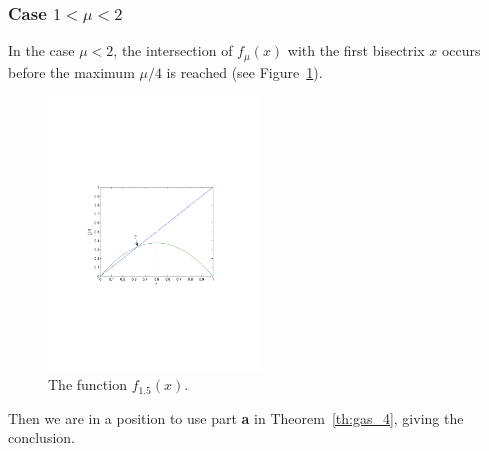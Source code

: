 \documentclass[12pt]{article}
\theoremstyle{plain}
\begin{document}
\subsubsection{Case $1<\mu<2$}
In the case $\mu<2$, the intersection of $f_\mu(x)$ with the first bisectrix $x$ occurs before the maximum $\mu/4$ is reached (see Figure~\ref{fig:logistic_1dot5}).
\begin{figure}[htbp]
\begin{center}
\includegraphics[width=0.5\textwidth]{logistic_1dot5}
\end{center}
\caption{The function $f_{1.5}(x)$.}\label{fig:logistic_1dot5}
\end{figure}
Then we are in a position to use part {\bf a} in Theorem~\ref{th:gas_4}, giving the conclusion.
\end{document}
